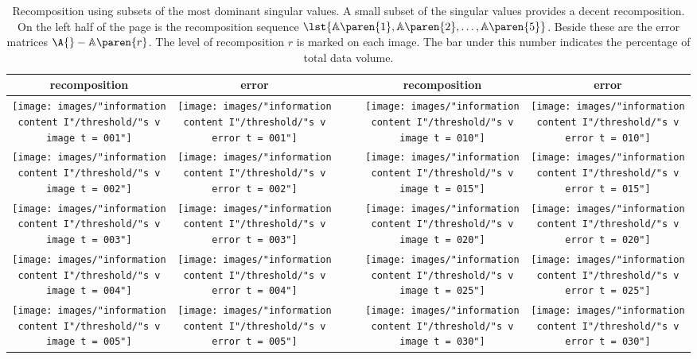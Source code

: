 \begin{table}[htdp]
\caption[Recomposition using a subset of the most dominant singular values]{Recomposition using subsets of the most dominant singular values. A small subset of the singular values provides a decent recomposition. On the left half of the page is the recomposition sequence $\lst{\mathbb{A}\paren{1}, \mathbb{A}\paren{2}, \dots, \mathbb{A}\paren{5}}$. Beside these are the error matrices $\A{}-\mathbb{A}\paren{r}$. The level of recomposition $r$ is marked on each image. The bar under this number indicates the percentage of total data volume. }
\begin{center}
\begin{tabular}{ccc|ccc}
%
  recomposition & error & \phantom{.} & \phantom{.} & recomposition & error\\\hline
%
 \texttt{[image: images/"information content I"/threshold/"s v image t = 001"]} &
 \texttt{[image: images/"information content I"/threshold/"s v error t = 001"]} &&&
%
 \texttt{[image: images/"information content I"/threshold/"s v image t = 010"]} &
 \texttt{[image: images/"information content I"/threshold/"s v error t = 010"]} \\
 \texttt{[image: images/"information content I"/threshold/"s v image t = 002"]} &
 \texttt{[image: images/"information content I"/threshold/"s v error t = 002"]} &&&
%
 \texttt{[image: images/"information content I"/threshold/"s v image t = 015"]} &
 \texttt{[image: images/"information content I"/threshold/"s v error t = 015"]} \\
 \texttt{[image: images/"information content I"/threshold/"s v image t = 003"]} &
 \texttt{[image: images/"information content I"/threshold/"s v error t = 003"]} &&&
%
 \texttt{[image: images/"information content I"/threshold/"s v image t = 020"]} &
 \texttt{[image: images/"information content I"/threshold/"s v error t = 020"]} \\
 \texttt{[image: images/"information content I"/threshold/"s v image t = 004"]} &
 \texttt{[image: images/"information content I"/threshold/"s v error t = 004"]} &&&
%
 \texttt{[image: images/"information content I"/threshold/"s v image t = 025"]} &
 \texttt{[image: images/"information content I"/threshold/"s v error t = 025"]} \\
 \texttt{[image: images/"information content I"/threshold/"s v image t = 005"]} &
 \texttt{[image: images/"information content I"/threshold/"s v error t = 005"]} &&&
%
 \texttt{[image: images/"information content I"/threshold/"s v image t = 030"]} &
 \texttt{[image: images/"information content I"/threshold/"s v error t = 030"]}
%
\end{tabular}
\end{center}
\label{tab:threshold:a}
\end{table}%

\endinput